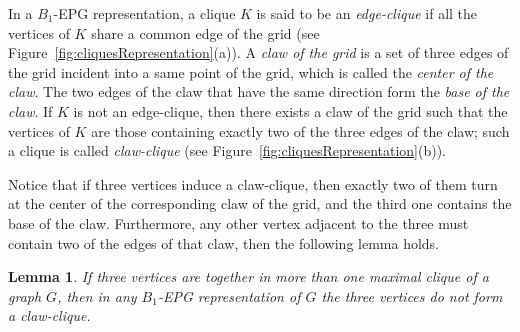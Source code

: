 \documentclass[9pt]{entcs}
\newtheorem{lema}{Lemma}[section]
\begin{document}
In  a $B_1$-EPG representation, a clique $K$  is said to be
 an \textit{edge-clique} if all the vertices of $K$ share a common edge of the grid (see Figure~\ref{fig:cliquesRepresentation}(a)).
 A \textit{claw of the grid} is a set of three edges of the grid incident into a same point of the grid, which is called
  the \textit{center of the claw}. The two edges of the claw that have the same direction form
    the \textit{ base of the claw}. If $K$ is not an edge-clique, then there exists
    a claw of the grid such that the vertices of $K$ are those containing exactly two of the three edges of the claw; such a  clique is called  \textit{claw-clique} \cite{golumbic2009} (see Figure~\ref{fig:cliquesRepresentation}(b)).%

    
    

Notice that if three vertices induce a claw-clique, then exactly two of them turn at the center of the corresponding  claw of the grid, and the third one contains the
base of the claw. 
Furthermore, any other vertex  adjacent to the three  must contain two of the edges of that claw, then the following lemma holds.

\begin{lema}\label{lem:cliquesMaximais}
If three vertices are together  in more than one maximal clique of a graph $G$, then in
any $B_1$-EPG representation of $G$ the three vertices do not form a claw-clique. %
\end{lema}

\end{document}
